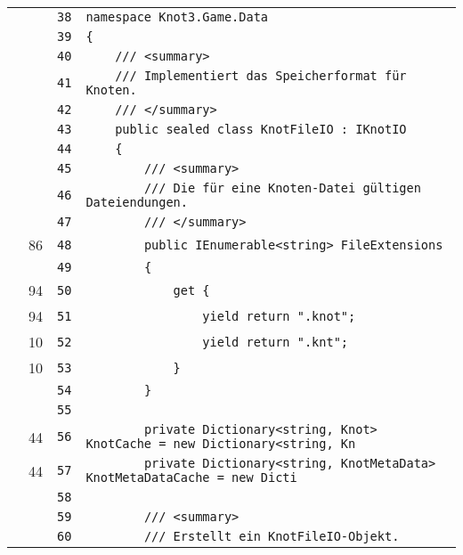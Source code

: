 \documentclass[a4paper,10pt]{article}
\begin{document}
\begin{longtable}[l]{lrrl}
\cellcolor{gray} &  & \verb~38~ & \verb~namespace Knot3.Game.Data~\\
\cellcolor{gray} &  & \verb~39~ & \verb~{~\\
\cellcolor{gray} &  & \verb~40~ & \verb~    /// <summary>~\\
\cellcolor{gray} &  & \verb~41~ & \verb~    /// Implementiert das Speicherformat für Knoten.~\\
\cellcolor{gray} &  & \verb~42~ & \verb~    /// </summary>~\\
\cellcolor{gray} &  & \verb~43~ & \verb~    public sealed class KnotFileIO : IKnotIO~\\
\cellcolor{gray} &  & \verb~44~ & \verb~    {~\\
\cellcolor{gray} &  & \verb~45~ & \verb~        /// <summary>~\\
\cellcolor{gray} &  & \verb~46~ & \verb~        /// Die für eine Knoten-Datei gültigen Dateiendungen.~\\
\cellcolor{gray} &  & \verb~47~ & \verb~        /// </summary>~\\
\cellcolor{green} & 86 & \verb~48~ & \verb~        public IEnumerable<string> FileExtensions~\\
\cellcolor{gray} &  & \verb~49~ & \verb~        {~\\
\cellcolor{green} & 94 & \verb~50~ & \verb~            get {~\\
\cellcolor{green} & 94 & \verb~51~ & \verb~                yield return ".knot";~\\
\cellcolor{green} & 10 & \verb~52~ & \verb~                yield return ".knt";~\\
\cellcolor{green} & 10 & \verb~53~ & \verb~            }~\\
\cellcolor{gray} &  & \verb~54~ & \verb~        }~\\
\cellcolor{gray} &  & \verb~55~ & \verb~~\\
\cellcolor{green} & 44 & \verb~56~ & \verb~        private Dictionary<string, Knot> KnotCache = new Dictionary<string, Kn~\\
\cellcolor{green} & 44 & \verb~57~ & \verb~        private Dictionary<string, KnotMetaData> KnotMetaDataCache = new Dicti~\\
\cellcolor{gray} &  & \verb~58~ & \verb~~\\
\cellcolor{gray} &  & \verb~59~ & \verb~        /// <summary>~\\
\cellcolor{gray} &  & \verb~60~ & \verb~        /// Erstellt ein KnotFileIO-Objekt.~\\

\end{longtable}
\end{document}
